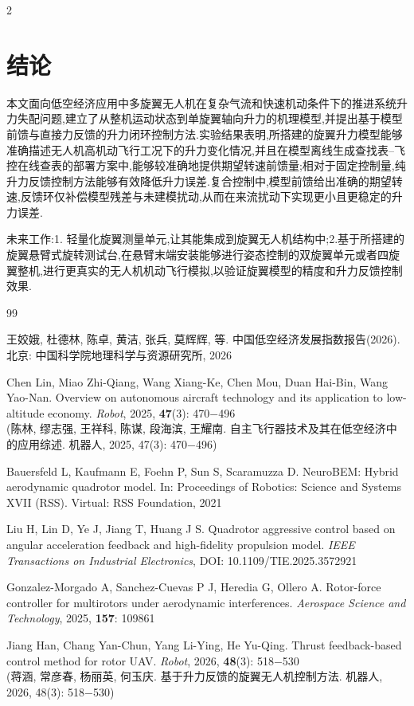 \documentclass{aas}
\begin{document}
\begin{multicols}{2}
\section{结论}

本文面向低空经济应用中多旋翼无人机在复杂气流和快速机动条件下的推进系统升力失配问题,建立了从整机运动状态到单旋翼轴向升力的机理模型,并提出基于模型前馈与直接力反馈的升力闭环控制方法.实验结果表明,所搭建的旋翼升力模型能够准确描述无人机高机动飞行工况下的升力变化情况,并且在模型离线生成查找表--飞控在线查表的部署方案中,能够较准确地提供期望转速前馈量;相对于固定控制量,纯升力反馈控制方法能够有效降低升力误差.复合控制中,模型前馈给出准确的期望转速,反馈环仅补偿模型残差与未建模扰动,从而在来流扰动下实现更小且更稳定的升力误差.

未来工作:1. 轻量化旋翼测量单元,让其能集成到旋翼无人机结构中;2.基于所搭建的旋翼悬臂式旋转测试台,在悬臂末端安装能够进行姿态控制的双旋翼单元或者四旋翼整机,进行更真实的无人机机动飞行模拟,以验证旋翼模型的精度和升力反馈控制效果.

\begin{thebibliography}{99}
 \addtolength{\itemsep}{0.2em} 

 王姣娥, 杜德林, 陈卓, 黄洁, 张兵, 莫辉辉, 等. 中国低空经济发展指数报告(2026). 北京: 中国科学院地理科学与资源研究所, 2026

 Chen Lin, Miao Zhi-Qiang, Wang Xiang-Ke, Chen Mou, Duan Hai-Bin, Wang Yao-Nan. Overview on autonomous aircraft technology and its application to low-altitude economy. {\sl Robot}, 2025, {\bf 47}(3): 470$-$496 \\
(陈林, 缪志强, 王祥科, 陈谋, 段海滨, 王耀南. 自主飞行器技术及其在低空经济中的应用综述. 机器人, 2025, 47(3): 470$-$496)

 Bauersfeld L, Kaufmann E, Foehn P, Sun S, Scaramuzza D. NeuroBEM: Hybrid aerodynamic quadrotor model. In: Proceedings of Robotics: Science and Systems XVII (RSS). Virtual: RSS Foundation, 2021

 Liu H, Lin D, Ye J, Jiang T, Huang J S. Quadrotor aggressive control based on angular acceleration feedback and high-fidelity propulsion model. {\sl IEEE Transactions on Industrial Electronics}, DOI: 10.1109/TIE.2025.3572921

 Gonzalez-Morgado A, Sanchez-Cuevas P J, Heredia G, Ollero A. Rotor-force controller for multirotors under aerodynamic interferences. {\sl Aerospace Science and Technology}, 2025, {\bf 157}: 109861

 Jiang Han, Chang Yan-Chun, Yang Li-Ying, He Yu-Qing. Thrust feedback-based control method for rotor UAV. {\sl Robot}, 2026, {\bf 48}(3): 518$-$530 \\
(蒋涵, 常彦春, 杨丽英, 何玉庆. 基于升力反馈的旋翼无人机控制方法. 机器人, 2026, 48(3): 518$-$530)


\end{thebibliography}
\end{multicols}
\end{document}
